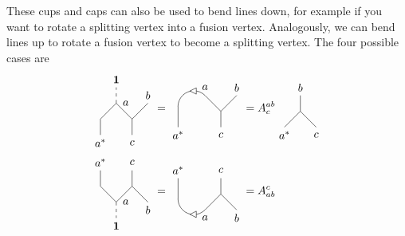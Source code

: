 These cups and caps can also be used to bend lines down, for example if you want to rotate a splitting vertex into a fusion vertex. Analogously, we can bend lines up to rotate a fusion vertex to become a splitting vertex. The four possible cases are
	\begin{align}
		\begin{tikzpicture}[baseline=(current bounding box.center),xscale=-1]
			\draw (0,1) -- (0.5,0.5) -- (1,1) -- (1.5,0.5) -- (1.5,0);
			\draw[dashed] (1,1) -- (1,1.5);
			\node at (1,1.75) {$\mathbf{1}$};
			\draw (0.5,0.5) -- (0.5,0);
			\node at (0,1.25) {$b$};
			\node at (0.7,1) {$a$};
			\node at (1.5,-0.25) {$a^*$};
			\node at (0.5,-0.25) {$c$};
		\end{tikzpicture}&=
		\begin{tikzpicture}[baseline=(current bounding box.center),xscale=-1]
			\draw (0,1) -- (0.5,0.5) -- (1,1);
			\draw (0.5,0.5) -- (0.5,0);
			\node at (0,1.25) {$b$};
			\node at (1,1.25) {$a$};
			\node at (1.85,-0.25) {$a^*$};
			\node at (0.5,-0.25) {$c$};
			\draw (1,1) arc (135:0:0.5);
			\draw (1.85,0.65) -- (1.85,0);
			\draw[fill=white] (1.475,1.14) -- (1.275,1.04) -- (1.275,1.24) -- cycle;
		\end{tikzpicture}=A_c^{ab}
		\begin{tikzpicture}[baseline=(current bounding box.center),xscale=-1]
			\draw (0,0) -- (0.5,0.5) -- (1,0);
			\draw (0.5,0.5) -- (0.5,1);
			\node at (0,-0.25) {$c$};
			\node at (0.5,1.25) {$b$};
			\node at (1,-0.25) {$a^*$};
		\end{tikzpicture}\\
		\begin{tikzpicture}[baseline=(current bounding box.center),xscale=-1,yscale=-1]
			\draw (0,1) -- (0.5,0.5) -- (1,1) -- (1.5,0.5) -- (1.5,0);
			\draw[dashed] (1,1) -- (1,1.5);
			\node at (1,1.75) {$\mathbf{1}$};
			\draw (0.5,0.5) -- (0.5,0);
			\node at (0,1.25) {$b$};
			\node at (0.7,1) {$a$};
			\node at (1.5,-0.25) {$a^*$};
			\node at (0.5,-0.25) {$c$};
		\end{tikzpicture}&=
		\begin{tikzpicture}[baseline=(current bounding box.center),xscale=-1,yscale=-1]
			\draw (0,1) -- (0.5,0.5) -- (1,1);
			\draw (0.5,0.5) -- (0.5,0);
			\node at (0,1.25) {$b$};
			\node at (1,1.25) {$a$};
			\node at (1.85,-0.25) {$a^*$};
			\node at (0.5,-0.25) {$c$};
			\draw (1,1) arc (135:0:0.5);
			\draw (1.85,0.65) -- (1.85,0);
			\draw[fill=white] (1.475,1.14) -- (1.275,1.04) -- (1.275,1.24) -- cycle;
		\end{tikzpicture}=A^c_{ab}

\end{align}
